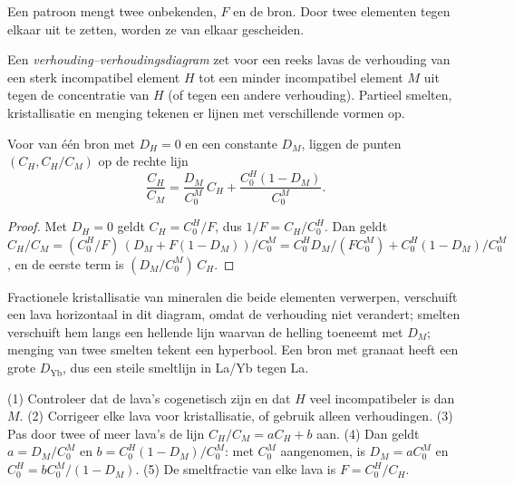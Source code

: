 Een patroon mengt twee onbekenden, $F$ en de bron. Door twee elementen tegen elkaar
uit te zetten, worden ze van elkaar gescheiden.

\begin{definition}\label{def:b3:trace-element-modelling:ratios}
Een \emph{verhouding--verhoudingsdiagram} zet voor een reeks
lavas de verhouding van een sterk incompatibel element $H$ tot een minder
incompatibel element $M$ uit tegen de concentratie van $H$ (of tegen een andere
verhouding). Partieel smelten, kristallisatie en menging tekenen er lijnen met
verschillende vormen op.
\end{definition}

\begin{proposition}[De batchsmeltlijn]\label{prop:b3:trace-element-modelling:line}
Voor  van één bron met $D_H = 0$ en een constante $D_M$, liggen de punten
$(C_H, C_H/C_M)$ op de rechte lijn
\[
\frac{C_H}{C_M} = \frac{D_M}{C_0^M}\,C_H + \frac{C_0^H(1 - D_M)}{C_0^M}.
\]
\end{proposition}

\begin{proof}
Met $D_H = 0$ geldt $C_H = C_0^H/F$, dus $1/F = C_H/C_0^H$. Dan geldt
$C_H/C_M = (C_0^H/F)\,(D_M + F(1 - D_M))/C_0^M = C_0^HD_M/(FC_0^M) +
C_0^H(1 - D_M)/C_0^M$, en de eerste term is $(D_M/C_0^M)\,C_H$.
\end{proof}

Fractionele kristallisatie van mineralen die beide elementen verwerpen, verschuift een lava
horizontaal in dit diagram, omdat de verhouding niet verandert; smelten verschuift hem
langs een hellende lijn waarvan de helling toeneemt met $D_M$; menging van twee smelten
tekent een hyperbool. Een bron met granaat heeft een grote $D_{\mathrm{Yb}}$, dus een steile
smeltlijn in La/Yb tegen La.

\begin{method}\label{met:b3:trace-element-modelling:invert}
(1) Controleer dat de lava's cogenetisch zijn en dat $H$ veel incompatibeler is
dan $M$. (2) Corrigeer elke lava voor kristallisatie, of gebruik alleen verhoudingen.
(3) Pas door twee of meer lava's de lijn $C_H/C_M = aC_H + b$ aan. (4) Dan geldt
$a = D_M/C_0^M$ en $b = C_0^H(1 - D_M)/C_0^M$: met $C_0^M$ aangenomen, is $D_M =
aC_0^M$ en $C_0^H = bC_0^M/(1 - D_M)$. (5) De smeltfractie van elke lava is
$F = C_0^H/C_H$.
\end{method}

